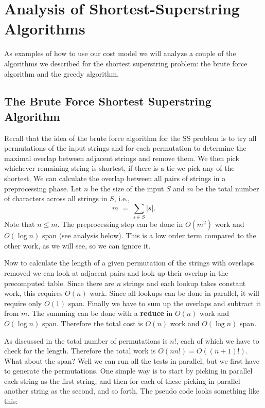 \section{Analysis of Shortest-Superstring Algorithms}

As examples of how to use our cost model we will analyze a couple of
the algorithms we described for the shortest superstring problem: the
brute force algorithm and the greedy algorithm.

\subsection{The Brute Force Shortest Superstring Algorithm}

Recall that the idea of the brute force algorithm for the SS problem
is to try all permutations of the input strings and for each
permutation to determine the maximal overlap between adjacent strings
and remove them.  We then pick whichever remaining string is shortest,
if there is a tie we pick any of the shortest.  We can calculate
the overlap between all pairs of strings in a preprocessing phase.  
Let $n$ be the size of the input $S$ and $m$ be the total number of characters
across all strings in $S$, i.e.,
\[ m \;=\; \sum_{s \in S} |s|. \] Note that $n \leq m$.  The
preprocessing step can be done in $O(m^2)$ work and $O(\log n)$ span
(see analysis below).  This is a low order term compared to the other
work, as we will see, so we can ignore it.

Now to calculate the length of a given permutation of the strings with
overlaps removed we can look at adjacent pairs and look up their
overlap in the precomputed table.  Since there are $n$ strings and
each lookup takes constant work, this requires $O(n)$ work.  Since all
lookups can be done in parallel, it will require only $O(1)$ span.
Finally we have to sum up the overlaps and subtract it from $m$.  The
summing can be done with a \textbf{reduce} in $O(n)$ work and $O(\log
n)$ span.  Therefore the total cost is $O(n)$ work and $O(\log n)$
span.

As discussed in  the total number of permutations is
$n!$, each of which we have to check for the length.  Therefore the
total work is $O(n n!) = O((n+1)!)$.  What about the span?  Well we
can run all the tests in parallel, but we first have to generate the
permutations.  One simple way is to start by picking in parallel each
string as the first string, and then for each of these picking in
parallel another string as the second, and so forth.  The pseudo code
looks something like this:

